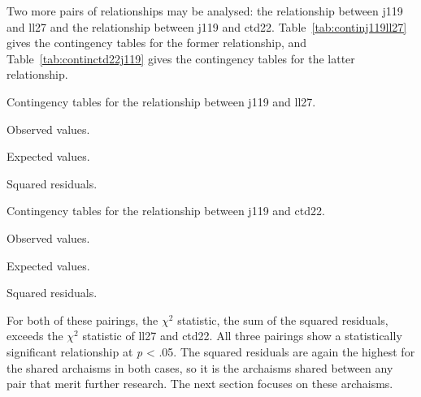 Two more pairs of relationships may be analysed: the relationship between \gls{j119} and \gls{ll27} and the relationship between \gls{j119} and \gls{ctd22}. Table~\ref{tab:continj119ll27} gives the contingency tables for the former relationship, and Table~\ref{tab:continctd22j119} gives the contingency tables for the latter relationship. 
\begin{table}[h]
  \centering
  \caption{Contingency tables for the relationship between \acrshort{j119} and \acrshort{ll27}.}
  \label{tab:continj119ll27}
  \begin{subtable}[b]{0.5\linewidth}
    \centering
    \caption{Observed values.}
    \label{stab:obsj119ll27}
  \end{subtable}%
  \begin{subtable}[b]{0.5\linewidth}
    \centering
    \caption{Expected values.}
    \label{stab:expj119ll27}
  \end{subtable}
  \begin{subtable}[b]{0.5\linewidth}
    \centering
    \caption{Squared residuals.}
    \label{stab:sqresj119ll27}
  \end{subtable}
\end{table}

\begin{table}[h]
  \centering
  \caption{Contingency tables for the relationship between \acrshort{j119} and \acrshort{ctd22}.}
  \label{tab:continctd22j119}
  \begin{subtable}[b]{0.5\linewidth}
    \centering
    \caption{Observed values.}
    \label{stab:obsctd22j119}
  \end{subtable}%
  \begin{subtable}[b]{0.5\linewidth}
    \centering
    \caption{Expected values.}
    \label{stab:expctd22j119}
  \end{subtable}
  \begin{subtable}[b]{0.5\linewidth}
    \centering
    \caption{Squared residuals.}
    \label{stab:sqresctd22j119}
  \end{subtable}
\end{table}
For both of these pairings, the \(\chi^2\) statistic, \ie the sum of the squared residuals, exceeds the \(\chi^2\) statistic of \gls{ll27} and \gls{ctd22}. All three pairings show a statistically significant relationship at \textit{p} < .05. The squared residuals are again the highest for the shared archaisms in both cases, so it is the archaisms shared between any pair that merit further research. The next section  focuses on these archaisms.

